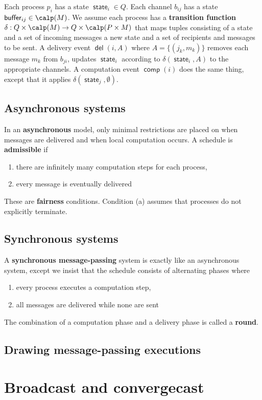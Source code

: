 \documentclass[11pt]{article}
\DeclareMathOperator{\state}{\textsf{state}}
\DeclareMathOperator{\buffer}{\textsf{buffer}}
\DeclareMathOperator{\del}{\textsf{del}}
\DeclareMathOperator{\comp}{\textsf{comp}}
\begin{document}
Each process \(p_i\) has a state \(\state_i\in Q\). Each channel \(b_{ij}\) has a state \(\buffer_{ij}\in\calp(M)\).
We assume each process has a \textbf{transition function} \(\delta:Q\times\calp(M)\to Q\times\calp(P\times M)\) that maps tuples consisting
of a state and a set of incoming messages a new state and a set of recipients and messages to be sent.
A delivery event \(\del(i,A)\) where \(A=\{(j_k,m_k)\}\) removes each message \(m_k\) from \(b_{ji}\),
updates \(\state_i\) according to \(\delta(\state_i,A)\) to the appropriate channels. A computation event \(\comp(i)\)
does the same thing, except that it applies \(\delta(\state_j,\emptyset)\).
\subsection{Asynchronous systems}
\label{sec:orgc7f1a15}
In an \textbf{asynchronous} model, only minimal restrictions are placed on when messages are delivered and when
local computation occurs. A schedule is \textbf{admissible} if
\begin{enumerate}
\item there are infinitely many computation steps for each process,
\item every message is eventually delivered
\end{enumerate}
These are \textbf{fairness} conditions. Condition (a) assumes that processes do not explicitly terminate.
\subsection{Synchronous systems}
\label{sec:org69a7acc}
A \textbf{synchronous message-passing} system is exactly like an asynchronous system, except we insist that the
schedule consists of alternating phases where
\begin{enumerate}
\item every process executes a computation step,
\item all messages are delivered while none are sent
\end{enumerate}
The combination of a computation phase and a delivery phase is called a \textbf{round}.
\subsection{Drawing message-passing executions}
\label{sec:orgfdd0a73}
\section{Broadcast and convergecast}
\label{sec:org600826a}
\end{document}
